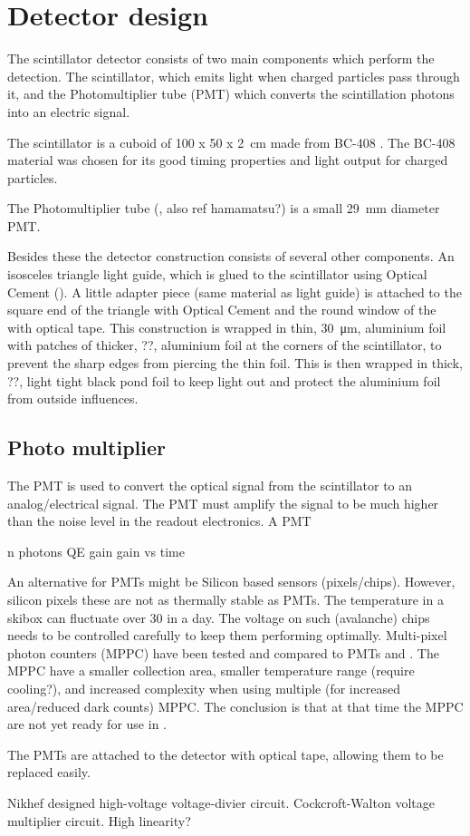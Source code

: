 \section{Detector design}

The scintillator detector consists of two main components which perform the detection. The scintillator, which emits light when charged particles pass through it, and the Photomultiplier tube (PMT) which converts the scintillation photons into an electric signal.

The scintillator is a cuboid of \SI[product-units=power]{100 x 50 x
2}{\centi\meter} made from BC-408 \cite{bc408}. The BC-408 material was
chosen for its good timing properties and light output for charged particles.

The Photomultiplier tube (\cite{et:pmt}, also ref hamamatsu?) is a small
\SI{29}{\milli\meter} diameter PMT.

Besides these the detector construction consists of several other components.
An isosceles triangle light guide, which is glued to the scintillator using
Optical Cement (\cite{bc600}). A little adapter piece (same material as light
guide) is attached to the square end of the triangle with Optical Cement and
the round window of the \pmt with optical tape. This construction is wrapped
in thin, \SI{30}{\micro\meter}, aluminium foil with patches of thicker, ??,
aluminium foil at the corners of the scintillator, to prevent the sharp edges
from piercing the thin foil. This is then wrapped in thick, ??, light tight
black pond foil to keep light out and protect the aluminium foil from outside
influences.


\subsection{Photo multiplier}

The PMT is used to convert the optical signal from the scintillator to an analog/electrical signal. The PMT must amplify the signal to be much higher than the noise level in the readout electronics. A PMT 

n photons
QE
gain
gain vs time

An alternative for PMTs might be Silicon based sensors (pixels/chips). However, silicon pixels these are not as thermally stable as PMTs. The temperature in a \hisparc skibox can fluctuate over \SI{30}{\celcius} in a day. The voltage on such (avalanche) chips needs to be controlled carefully to keep them performing optimally. Multi-pixel photon counters (MPPC) have been tested and compared to PMTs \cite[Chapter~3.4]{lio2011} and \cite[Chapter~3.6]{lio2010}. The MPPC have a smaller collection area, smaller temperature range (require cooling?), and increased complexity when using multiple (for increased area/reduced dark counts) MPPC. The conclusion is that at that time the MPPC are not yet ready for use in \hisparc.

The PMTs are attached to the detector with optical tape, allowing them to be replaced easily.

Nikhef designed high-voltage voltage-divier circuit.
Cockcroft-Walton voltage multiplier circuit.
High linearity?


